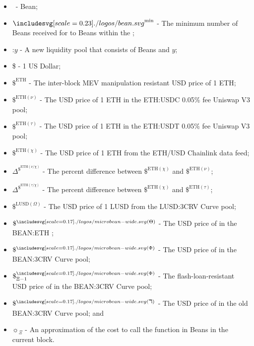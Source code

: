 \documentclass[class=article, crop=false]{standalone}
\begin{document}
\begin{itemize}[topsep=0pt, itemsep=3pt,leftmargin=16pt]
    \item[] \Bean\ - Bean;
    \item[] $\Bean^{\text{min}}$ - The minimum number of Beans received for  to  Beans within the ;
    \item[] \Bean:$y$ - \hypertarget{ht6}{A new liquidity pool that consists of Beans and $y$};
    \item[] \$ - 1 US Dollar;
    \item[] $\$^{\text{ETH}}$ - The inter-block MEV manipulation resistant USD price of 1 ETH;
    \item[] $\$^{\text{ETH}(\nu)}$ - The USD price of 1 ETH in the ETH:USDC 0.05\% fee Uniswap V3 pool;
    \item[] $\$^{\text{ETH}(\tau)}$ - The USD price of 1 ETH in the ETH:USDT 0.05\% fee Uniswap V3 pool;
    \item[] $\$^{\text{ETH}(\chi)}$ - The USD price of 1 ETH from the ETH/USD Chainlink data feed;
    \item[] $\Delta^{\$^{\text{ETH}(\nu \slash \chi)}}$ - The percent difference between $\$^{\text{ETH}(\chi)}$ and $\$^{\text{ETH}(\nu)}$;
    \item[] $\Delta^{\$^{\text{ETH}(\tau \slash \chi)}}$ - The percent difference between $\$^{\text{ETH}(\chi)}$ and $\$^{\text{ETH}(\tau)}$;
    \item[] $\$^{\text{LUSD}(\Omega)}$ - \hypertarget{ht4}{The USD price of 1 LUSD from the LUSD:3CRV Curve pool};
    \item[] $\$^{\bean(\Theta)}$ - The USD price of  in the BEAN:ETH ;
    \item[] $\$^{\bean(\Phi)}$ - \hypertarget{ht2}{The USD price of  in the BEAN:3CRV Curve pool};
    \item[] $\$^{\bean(\Phi)}_{\Xi-1}$ - \hypertarget{ht3}{The flash-loan-resistant USD price of  in the BEAN:3CRV Curve pool};
    \item[] $\$^{\bean(\daleth)}$ - \hypertarget{ht1a}{The USD price of  in the old BEAN:3CRV Curve pool}; and
    
    \item[] $\sun_{\Xi}$ - An approximation of the cost to call the  function in Beans in the current block.
\end{itemize}
\end{document}
